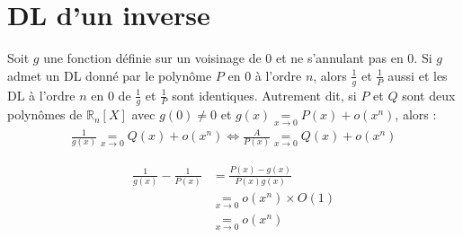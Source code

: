 \documentclass[../main.tex]{subfiles}
\begin{document}
\section{DL d'un inverse}
\begin{tcolorbox}[title=Propostion 25.65, title filled=false, colframe=lightblue, colback=lightblue!10!white]
    Soit $g$ une fonction définie sur un voisinage de $0$ et ne s'annulant pas en $0$. Si $g$ admet un DL donné par le polynôme $P$ en $0$ à l'ordre $n$, alors $\frac{1}{g}$ et $\frac{1}{P}$ aussi et les DL à l'ordre $n$ en $0$ de $\frac{1}{g}$ et $\frac{1}{P}$ sont identiques. Autrement dit, si $P$ et $Q$ sont deux polynômes de $\mathbb{R}_n[X]$ avec $g(0) \neq 0$ et $g(x) \underset{x\to 0}{=} P(x) + o(x^n)$, alors : 
    \begin{align*}
        \frac{1}{g(x)} \underset{x\to 0}{=} Q(x) + o(x^n) \Leftrightarrow \frac{A}{P(x)} \underset{x\to 0}{=} Q(x) + o(x^n)
    \end{align*}
\end{tcolorbox}

\begin{align*}
    \frac{1}{g(x)} - \frac{1}{P(x)} &= \frac{P(x) - g(x)}{P(x)g(x)} \\
    &\underset{x\to 0}{=} o(x^n) \times O(1) \\
    &\underset{x\to 0}{=} o(x^n)
\end{align*}
\end{document}
